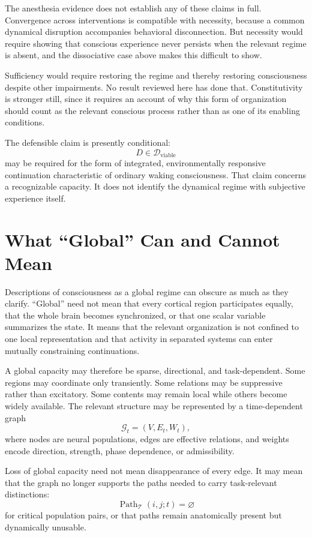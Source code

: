 \documentclass[11pt]{book}
\begin{document}
The anesthesia evidence does not establish any of these claims in full. Convergence across interventions is compatible with necessity, because a common dynamical disruption accompanies behavioral disconnection. But necessity would require showing that conscious experience never persists when the relevant regime is absent, and the dissociative case above makes this difficult to show.

Sufficiency would require restoring the regime and thereby restoring consciousness despite other impairments. No result reviewed here has done that. Constitutivity is stronger still, since it requires an account of why this form of organization should count as the relevant conscious process rather than as one of its enabling conditions.

The defensible claim is presently conditional:
\[
D\in\mathcal D_{\mathrm{viable}}
\]
may be required for the form of integrated, environmentally responsive continuation characteristic of ordinary waking consciousness. That claim concerns a recognizable capacity. It does not identify the dynamical regime with subjective experience itself.

\section*{What ``Global'' Can and Cannot Mean}

Descriptions of consciousness as a global regime can obscure as much as they clarify. ``Global'' need not mean that every cortical region participates equally, that the whole brain becomes synchronized, or that one scalar variable summarizes the state. It means that the relevant organization is not confined to one local representation and that activity in separated systems can enter mutually constraining continuations.

A global capacity may therefore be sparse, directional, and task-dependent. Some regions may coordinate only transiently. Some relations may be suppressive rather than excitatory. Some contents may remain local while others become widely available. The relevant structure may be represented by a time-dependent graph
\[
\mathcal G_t=(V,E_t,W_t),
\]
where nodes are neural populations, edges are effective relations, and weights encode direction, strength, phase dependence, or admissibility.

Loss of global capacity need not mean disappearance of every edge. It may mean that the graph no longer supports the paths needed to carry task-relevant distinctions:
\[
\operatorname{Path}_{\mathcal T}
(i,j;t)
=
\varnothing
\]
for critical population pairs, or that paths remain anatomically present but dynamically unusable.
\end{document}
